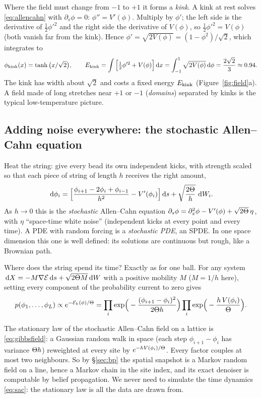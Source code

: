 Where the field must change from $-1$ to $+1$ it forms a \emph{kink}. A kink at rest solves
\eqref{eq:allencahn} with $\partial_s\phi=0$: $\phi''=V'(\phi)$. Multiply by $\phi'$; the left side is the derivative of
$\tfrac12\phi'^2$ and the right side the derivative of $V(\phi)$, so $\tfrac12\phi'^2=V(\phi)$ (both vanish far from the
kink). Hence $\phi'=\sqrt{2V(\phi)}=(1-\phi^2)/\sqrt2$, which integrates to
\begin{equation}\label{eq:kink}
  \phi_{\rm kink}(x)=\tanh\big(x/\sqrt2\big),\qquad
  E_{\rm kink}=\int\Big[\tfrac12\phi'^2+V(\phi)\Big]\,\mathrm{d} x=\int_{-1}^{1}\sqrt{2V(\phi)}\,\mathrm{d}\phi=\frac{2\sqrt2}{3}\approx0.94 .
\end{equation}
The kink has width about $\sqrt2$ and costs a fixed energy $E_{\rm kink}$ (Figure~\ref{fig:field}a). A field made of
long stretches near $+1$ or $-1$ (\emph{domains}) separated by kinks is the typical low-temperature picture.

\subsection{Adding noise everywhere: the stochastic Allen--Cahn equation}

Heat the string: give every bead its own independent kicks, with strength scaled so that each piece of
string of length $h$ receives the right amount,
\begin{equation}\label{eq:sac}
  \,\mathrm{d}\phi_i=\Big[\frac{\phi_{i+1}-2\phi_i+\phi_{i-1}}{h^2}-V'(\phi_i)\Big]\,\mathrm{d} s+\sqrt{\frac{2\Theta}{h}}\,\,\mathrm{d} W_i .
\end{equation}
As $h\to0$ this is the \emph{stochastic} Allen--Cahn equation $\partial_s\phi=\partial_x^2\phi-V'(\phi)+\sqrt{2\Theta}\,\eta$, with $\eta$
``space-time white noise'' (independent kicks at every point and every time). A PDE with random forcing is a
\emph{stochastic PDE}, an SPDE. In one space dimension this one is well defined: its solutions are continuous
but rough, like a Brownian path.

Where does the string spend its time? Exactly as for one ball. For any system $\,\mathrm{d} X=-M\nabla\mathcal{E}\,\mathrm{d} s+\sqrt{2\Theta M}\,\mathrm{d} W$
with a positive mobility $M$ ($M=1/h$ here), setting every component of the probability current to zero gives
\begin{equation}\label{eq:gibbsfield}
  p(\phi_1,\dots,\phi_L)\propto e^{-\mathcal{E}_h(\phi)/\Theta}=\prod_i\exp\!\Big(-\frac{(\phi_{i+1}-\phi_i)^2}{2\Theta h}\Big)\prod_i\exp\!\Big(-\frac{h\,V(\phi_i)}{\Theta}\Big).
\end{equation}
\begin{keyidea}
The stationary law of the stochastic Allen--Cahn field on a lattice is \eqref{eq:gibbsfield}: a Gaussian random walk
in space (each step $\phi_{i+1}-\phi_i$ has variance $\Theta h$) reweighted at every site by $e^{-hV(\phi_i)/\Theta}$. Every factor
couples at most two neighbours. So by \S\ref{sec:bp} the spatial snapshot is a Markov random field on a line,
hence a Markov chain in the site index, and its exact denoiser is computable by belief propagation. We never
need to simulate the time dynamics \eqref{eq:sac}: the stationary law is all the data are drawn from.
\end{keyidea}

